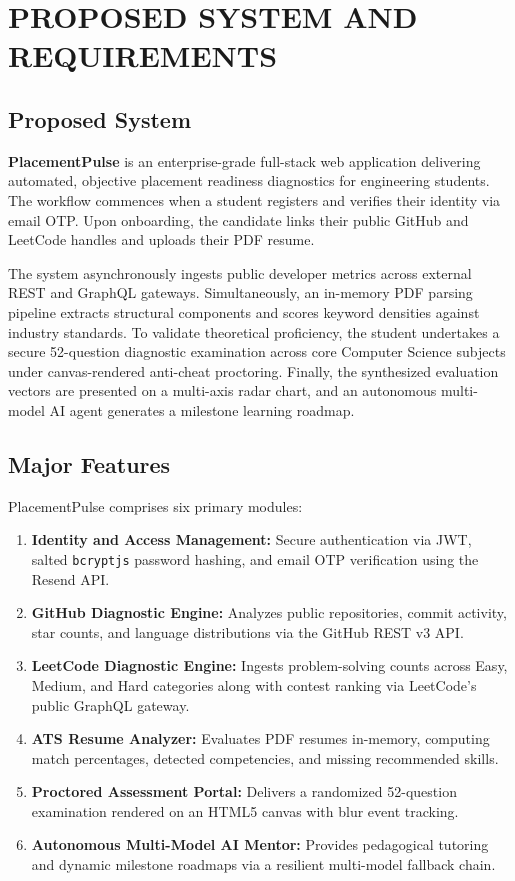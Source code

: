 \chapter{PROPOSED SYSTEM AND REQUIREMENTS}

\section{Proposed System}
\textbf{PlacementPulse} is an enterprise-grade full-stack web application delivering automated, objective placement readiness diagnostics for engineering students. The workflow commences when a student registers and verifies their identity via email OTP. Upon onboarding, the candidate links their public GitHub and LeetCode handles and uploads their PDF resume. 

The system asynchronously ingests public developer metrics across external REST and GraphQL gateways. Simultaneously, an in-memory PDF parsing pipeline extracts structural components and scores keyword densities against industry standards. To validate theoretical proficiency, the student undertakes a secure 52-question diagnostic examination across core Computer Science subjects under canvas-rendered anti-cheat proctoring. Finally, the synthesized evaluation vectors are presented on a multi-axis radar chart, and an autonomous multi-model AI agent generates a milestone learning roadmap.

\section{Major Features}
PlacementPulse comprises six primary modules:
\begin{enumerate}
    \item \textbf{Identity and Access Management:} Secure authentication via JWT, salted \texttt{bcryptjs} password hashing, and email OTP verification using the Resend API.
    \item \textbf{GitHub Diagnostic Engine:} Analyzes public repositories, commit activity, star counts, and language distributions via the GitHub REST v3 API.
    \item \textbf{LeetCode Diagnostic Engine:} Ingests problem-solving counts across Easy, Medium, and Hard categories along with contest ranking via LeetCode's public GraphQL gateway.
    \item \textbf{ATS Resume Analyzer:} Evaluates PDF resumes in-memory, computing match percentages, detected competencies, and missing recommended skills.
    \item \textbf{Proctored Assessment Portal:} Delivers a randomized 52-question examination rendered on an HTML5 canvas with blur event tracking.
    \item \textbf{Autonomous Multi-Model AI Mentor:} Provides pedagogical tutoring and dynamic milestone roadmaps via a resilient multi-model fallback chain.
\end{enumerate}

